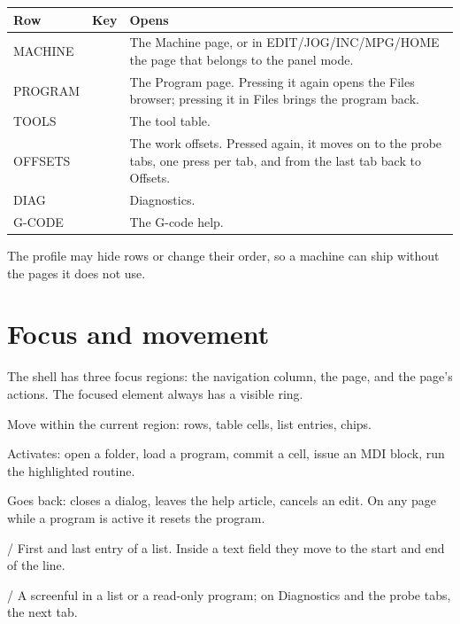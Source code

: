 \begin{longtable}{L{3.4cm}L{2.4cm}L{7.0cm}}
  \toprule
  \textbf{Row} & \textbf{Key} & \textbf{Opens} \\
  \midrule
  \endhead
  \textsf{MACHINE} &  & The Machine page, or in EDIT/JOG/INC/MPG/HOME the page
        that belongs to the panel mode. \\
  \textsf{PROGRAM} &  & The Program page. Pressing it again opens the Files
        browser; pressing it in Files brings the program back. \\
  \textsf{TOOLS} &  & The tool table. \\
  \textsf{OFFSETS} &  & The work offsets. Pressed again, it moves on to the probe
        tabs, one press per tab, and from the last tab back to Offsets. \\
  \textsf{DIAG} &  & Diagnostics. \\
  \textsf{G-CODE} &  & The G-code help. \\
  \bottomrule
\end{longtable}

The profile may hide rows or change their order, so a machine can ship without the pages it
does not use.

\section{Focus and movement}

The shell has three focus regions: the navigation column, the page, and the page's actions.
The focused element always has a visible ring.

\begin{description}[font=\normalfont\sffamily\bfseries, leftmargin=3.2cm, style=nextline]
  \item[Arrow keys] Move within the current region: rows, table cells, list entries, chips.
  \item[\keycap{Enter}] Activates: open a folder, load a program, commit a cell, issue an MDI
        block, run the highlighted routine.
  \item[\keycap{Esc}] Goes back: closes a dialog, leaves the help article, cancels an edit.
        On any page while a program is active it resets the program.
  \item[\keycap{Home}] /  First and last entry of a list. Inside a text field
        they move to the start and end of the line.
  \item[\keycap{PgUp}] /  A screenful in a list or a read-only program; on
        Diagnostics and the probe tabs, the next tab.
\end{description}

